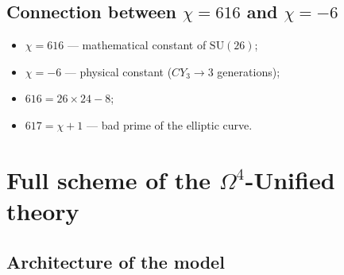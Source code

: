 \documentclass[12pt,a4paper,twoside]{article}
\newcommand{\SU}{\mathrm{SU}}
\theoremstyle{definition}
\begin{document}
\subsection{Connection between $\chi = 616$ and $\chi = -6$}

\begin{itemize}
    \item $\chi = 616$ — mathematical constant of $\SU(26)$;
    \item $\chi = -6$ — physical constant ($CY_3 \to 3$ generations);
    \item $616 = 26 \times 24 - 8$;
    \item $617 = \chi + 1$ — bad prime of the elliptic curve.
\end{itemize}

\section{Full scheme of the $\Omega^4$-Unified theory}
\label{sec:full_scheme}

\subsection{Architecture of the model}
\end{document}
